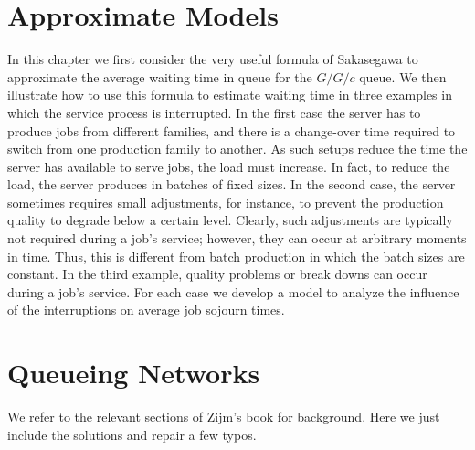 \chapter{Approximate Models}
\label{cha:approximate-models}
In this chapter we first consider the very useful formula of Sakasegawa to approximate the average waiting time in queue for the $G/G/c$ queue.
We then illustrate how to use this formula to estimate waiting time in three examples in which the service process is interrupted.
In the first case the server has to produce jobs from different families, and there is a change-over time required to switch from one production family to another.
As such setups reduce the time the server has available to serve jobs, the load must increase.
In fact, to reduce the load, the server produces in batches of fixed sizes.
In the second case, the server sometimes requires small adjustments, for instance, to prevent the production quality to degrade below a certain level.
Clearly, such adjustments are typically not required during a job's service; however, they can occur at arbitrary moments in time.
Thus, this is different from batch production in which the batch sizes are constant.
In the third example, quality problems or break downs can occur during a job's service.
For each case we develop a model to analyze the influence of the interruptions on average job sojourn times.






%

\ifshowextra
   
\fi

\chapter{Queueing Networks}
\label{sec:notes-relat-chapt2}

We refer to the relevant sections of Zijm's book for background. Here we just include the solutions and repair a few typos. 


%

%

%

%

\ifshowextra
   
\fi

\backmatter

